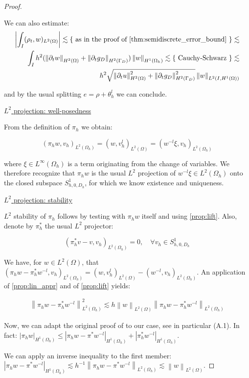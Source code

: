 \documentclass[english,a4paper,9pt,oneside]{scrbook}	%
\theoremstyle{break}
\newenvironment{mproof}[1][\proofname]{%
  \begin{proof}[#1]$ $\par\nobreak\ignorespaces
}{%
  \end{proof}
}
\renewcommand*{\proofname}{Proof}
\theoremstyle{remark}
\newcommand{\norm}[1]{\left\lVert#1\right\rVert}
\newcommand{\ind}[1]{\{\text{ #1 }\}}
\begin{document}
\begin{appendices}
\begin{mproof}
We can also estimate:
\begin{align*}
\left | \int_I (\rho_t, w)_{L^2(\Omega)}\right |\lesssim \ind{as in the proof of \cref{thm:semidiscrete_error_bound}}\lesssim\\\int_I
h^2 (\norm{\partial_t w}_{H^2(\Omega)} + \norm{\partial_t g_D}_{H^2(\Gamma_D)})\norm{w}_{H^1(\Omega_h)} \lesssim \ind{Cauchy-Schwarz}\lesssim\\
h^2 \sqrt{\norm{\partial_t u}_{H^2(\Omega)}^2 + \norm{\partial_t g_D}_{H^2(\Gamma_D)}^2}\norm{w}_{L^2(I,H^1(\Omega))}
\end{align*}

and by the usual splitting $e=\rho + \theta_h^l$ we can conclude.

\underline{$L^2$ projection: well-posedness}

From the definition of $\pi_h$ we obtain:

$$(\pi_h w, v_h)_{L^2(\Omega_h)}=(w, v_h^l)_{L^2(\Omega)}  = (w^{-l} \xi, v_h)_{L^2(\Omega_h)}$$

where $\xi \in L^\infty(\Omega_h)$ is a term originating from the change of variables. We therefore recognize that $\pi_h w$ is the usual $L^2$ projection of $w^{-l} \xi\in L^2(\Omega_h)$ onto the closed subspace $S^1_{h,0,D_h}$, for which we know existence and uniqueness.

\underline{$L^2$ projection: stability}

$L^2$ stability of $\pi_h$ follows by testing with $\pi_h w$ itself and using \cref{prop:lift}.
Also, denote by $\pi_h^*$ the usual $L^2$ projector:

$$(\pi_h^* v - v, v_h)_{L^2(\Omega_h)}=0,\quad \forall  v_h \in S^1_{h,0,D_h}$$

We have, for $w \in L^2(\Omega)$, that $(\pi_h w - \pi_h^* w^{-l}, v_h)_{L^2(\Omega_h)} = (w, v_h^l)_{L^2(\Omega)} - (w^{-l}, v_h)_{L^2(\Omega_h)}$. An application of \cref{prop:lin_appr} and of \cref{prop:lift} yields:

\begin{align*}
	\norm{\pi_h w - \pi_h^* w^{-l}}^2_{L^2(\Omega_h)}\lesssim h \norm{w}_{L^2(\Omega)}\norm{\pi_h w - \pi_h^* w^{-l}}_{L^2(\Omega_h)}
\end{align*}

Now, we can adapt the original proof of \cite{bank} to our case, see in particular (A.1). 
In fact: $|\pi_h w|_{H^1(\Omega_h)}\leq |\pi_h w -\pi^* w^{-l}|_{H^1(\Omega_h)} + |\pi_h^* w^{-l}|_{H^1(\Omega_h)}$.

We can apply an inverse inequality to the first member: $|\pi_h w -\pi^* w^{-l}|_{H^1(\Omega_h)}\lesssim h^{-1}\norm{\pi_h w -\pi^* w^{-l}}_{L^2(\Omega_h)}\lesssim \norm{w}_{L^2(\Omega)}$.


\end{mproof}
\end{appendices}
\end{document}
